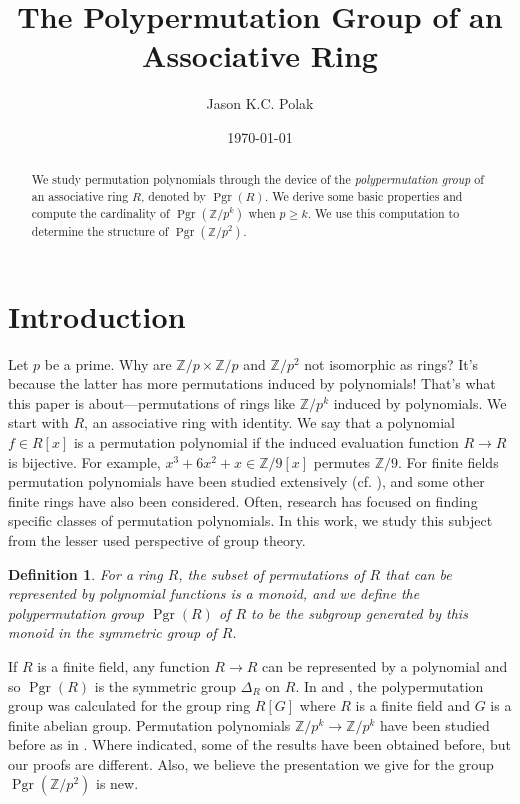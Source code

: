 \documentclass[oneside]{amsart}
\theoremstyle{nthm}
\theoremstyle{ndef}
\newtheorem{defn}[subsection]{Definition}
\theoremstyle{nrem}
\newcommand{\Z}{\mathbb{Z}}
\newcommand{\df}[1]{#1}
\DeclareMathOperator{\Pgr}{Pgr}
\begin{document}
\title{ The Polypermutation Group of an Associative Ring }
\begin{abstract}
     We study permutation polynomials through the device of the \emph{polypermutation group} of an associative ring $R$, denoted by $\Pgr(R)$. We derive some basic properties and compute the cardinality of $\Pgr(\Z/p^k)$ when $p\geq k$. We use this computation to determine the structure of $\Pgr(\Z/p^2)$.
\end{abstract}
\author{Jason K.C. Polak}
\date{\today}
\maketitle
\tableofcontents

\section{Introduction}
Let $p$ be a prime. Why are $\Z/p\times\Z/p$ and $\Z/p^2$ not isomorphic as rings? It's because the latter has more permutations induced by polynomials! That's what this paper is about---permutations of rings like $\Z/p^k$ induced by polynomials. We start with $R$, an associative ring with identity. We say that a polynomial $f\in R[x]$ is a \df{permutation polynomial} if the induced evaluation function $R\to R$ is bijective. For example, $x^3 + 6x^2 + x\in \Z/9[x]$ permutes $\Z/9$. For finite fields permutation polynomials have been studied extensively (cf. \cite[Chapter 7]{LidlNiederreiter2000}), and some other finite rings have also been considered. Often, research has focused on finding specific classes of permutation polynomials. In this work, we study this subject from the lesser used perspective of group theory.
\begin{defn}
    For a ring $R$, the subset of permutations of $R$ that can be represented by polynomial functions is a monoid, and we define the \df{polypermutation group} $\Pgr(R)$ of $R$ to be the subgroup generated by this monoid in the symmetric group of $R$.
\end{defn}
If $R$ is a finite field, any function $R\to R$ can be represented by a polynomial and so $\Pgr(R)$ is the symmetric group $\Delta_R$ on $R$. In \cite{Ashlock1993} and \cite{CarlitzHayes1972}, the polypermutation group  was calculated for the group ring $R[G]$ where $R$ is a finite field and $G$ is a finite abelian group. Permutation polynomials $\Z/p^k\to\Z/p^k$ have been studied before as in \cite{MR232756,MR1767431,MR764615}. Where indicated, some of the results have been obtained before, but our proofs are different. Also, we believe the presentation we give for the group $\Pgr(\Z/p^2)$ is new.
\end{document}
